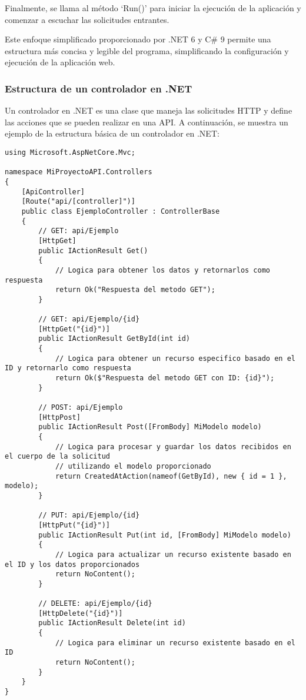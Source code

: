 \documentclass[executivepaper]{article}
\begin{document}
Finalmente, se llama al método \enquote*{Run()} para iniciar la ejecución de la aplicación y comenzar a escuchar las solicitudes entrantes.

Este enfoque simplificado proporcionado por .NET 6 y C\# 9 permite una estructura más concisa y legible del programa, simplificando la configuración y ejecución de la aplicación web.

\subsubsection{Estructura de un controlador en .NET}

Un controlador en .NET es una clase que maneja las solicitudes HTTP y define las acciones que se pueden realizar en una API. A continuación, se muestra un ejemplo de la estructura básica de un controlador en .NET:

\begin{lstlisting}[language={[Sharp]C}]
using Microsoft.AspNetCore.Mvc;

namespace MiProyectoAPI.Controllers
{
    [ApiController]
    [Route("api/[controller]")]
    public class EjemploController : ControllerBase
    {
        // GET: api/Ejemplo
        [HttpGet]
        public IActionResult Get()
        {
            // Logica para obtener los datos y retornarlos como respuesta
            return Ok("Respuesta del metodo GET");
        }

        // GET: api/Ejemplo/{id}
        [HttpGet("{id}")]
        public IActionResult GetById(int id)
        {
            // Logica para obtener un recurso especifico basado en el ID y retornarlo como respuesta
            return Ok($"Respuesta del metodo GET con ID: {id}");
        }

        // POST: api/Ejemplo
        [HttpPost]
        public IActionResult Post([FromBody] MiModelo modelo)
        {
            // Logica para procesar y guardar los datos recibidos en el cuerpo de la solicitud
            // utilizando el modelo proporcionado
            return CreatedAtAction(nameof(GetById), new { id = 1 }, modelo);
        }

        // PUT: api/Ejemplo/{id}
        [HttpPut("{id}")]
        public IActionResult Put(int id, [FromBody] MiModelo modelo)
        {
            // Logica para actualizar un recurso existente basado en el ID y los datos proporcionados
            return NoContent();
        }

        // DELETE: api/Ejemplo/{id}
        [HttpDelete("{id}")]
        public IActionResult Delete(int id)
        {
            // Logica para eliminar un recurso existente basado en el ID
            return NoContent();
        }
    }
}
\end{lstlisting}
\end{document}
